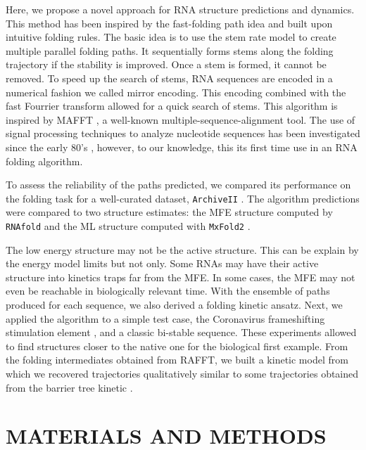 \documentclass[a4paper,12pt]{article}
\begin{document}
Here, we propose a novel approach for RNA structure predictions and dynamics.
This method has been inspired by the fast-folding path idea and built upon
intuitive folding rules. The basic idea is to use the stem rate model to create
multiple parallel folding paths. It sequentially forms stems along the folding
trajectory if the stability is improved. Once a stem is formed, it cannot be
removed. To speed up the search of stems, RNA sequences are encoded in a
numerical fashion we called mirror encoding. This encoding combined with the
fast Fourrier transform allowed for a quick search of stems. This algorithm is
inspired by MAFFT \cite{katoh02_mafft}, a well-known multiple-sequence-alignment
tool. The use of signal processing techniques to analyze nucleotide sequences
has been investigated since the early 80's
\cite{felsenstein82_effic_method_match_nucleic_acid_sequen,benson90_fourier_method_bioseq_analy},
however, to our knowledge, this its first time use in an RNA folding algorithm.

To assess the reliability of the paths predicted, we compared its performance on
the folding task for a well-curated dataset, \texttt{ArchiveII}
\cite{mathews19_how_to_bench_rna_secon}. The algorithm predictions were compared
to two structure estimates: the MFE structure computed by \texttt{RNAfold} and the ML
structure computed with \texttt{MxFold2} \cite{sato20_rna}.

The low energy structure may not be the active structure. This can be explain by
the energy model limits but not only. Some RNAs may have their active structure
into kinetics traps far from the MFE. In some cases, the MFE may not even be
reachable in biologically relevant time. With the ensemble of paths produced for
each sequence, we also derived a folding kinetic ansatz. Next, we applied the
algorithm to a simple test case, the Coronavirus frameshifting stimulation
element \cite{baranov05_progr_ribos_frames_decod_sars_cov_genom}, and a classic
bi-stable sequence. These experiments allowed to find structures closer to the
native one for the biological first example. From the folding intermediates
obtained from RAFFT, we built a kinetic model from which we recovered
trajectories qualitatively similar to some trajectories obtained from the
barrier tree kinetic \cite{flamm02_barrier_trees_degen_lands}.

\section*{MATERIALS AND METHODS}
\label{sec:org005a1fa}
\end{document}
